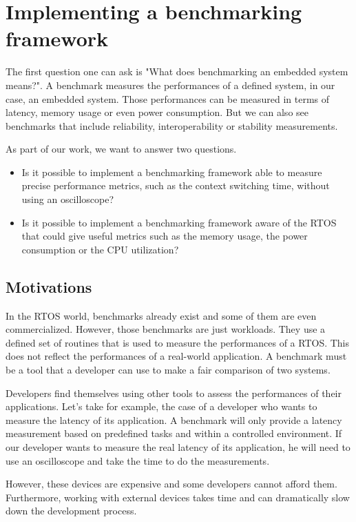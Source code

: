 \section{Implementing a benchmarking framework}

The first question one can ask is "What does benchmarking an embedded system means?".
A benchmark measures the performances of a defined system, in our case, an embedded system.
Those performances can be measured in terms of latency, memory usage or even power consumption.
But we can also see benchmarks that include reliability, interoperability or stability measurements.

As part of our work, we want to answer two questions.

\begin{itemize}
  \item Is it possible to implement a benchmarking framework able to measure precise performance metrics, such as the context switching time, without using an oscilloscope?
  \item Is it possible to implement a benchmarking framework aware of the RTOS that could give useful metrics such as the memory usage, the power consumption or the CPU utilization? %
\end{itemize}

\subsection{Motivations}

In the RTOS world, benchmarks already exist and some of them are even commercialized. \cite{mibench, parmibench, performance-benchmarking}
However, those benchmarks are just workloads.
They use a defined set of routines that is used to measure the performances of a RTOS.
This does not reflect the performances of a real-world application.
A benchmark must be a tool that a developer can use to make a fair comparison of two systems.

Developers find themselves using other tools to assess the performances of their applications.
Let's take for example, the case of a developer who wants to measure the latency of its application.
A benchmark will only provide a latency measurement based on predefined tasks and within a controlled environment.
If our developer wants to measure the real latency of its application, he will need to use an oscilloscope and take the time to do the measurements.

However, these devices are expensive and some developers cannot afford them.
Furthermore, working with external devices takes time and can dramatically slow down the development process.

